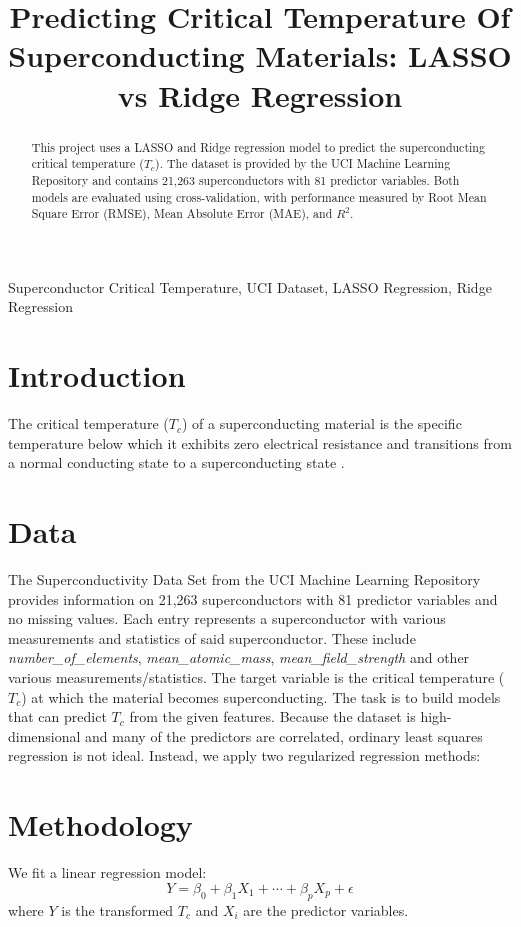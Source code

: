 \documentclass[conference]{IEEEtran}
\title{Predicting Critical Temperature Of Superconducting Materials: LASSO vs Ridge Regression}
\author{
  \IEEEauthorblockN{Miguel Ramirez}
  \IEEEauthorblockA{
    Department of Statistics and Data Science \\
    University of Central Florida \\
    Orlando, United States \\
    miramirez@knights.ucf.edu}
}
\begin{document}
\maketitle

\begin{abstract}
This project uses a LASSO and Ridge regression model to predict the superconducting critical temperature ($T_c$). 
The dataset is provided by the UCI Machine Learning Repository and contains 21,263 superconductors with 81 predictor variables. 
Both models are evaluated using cross-validation, with performance measured by Root Mean Square Error (RMSE), Mean Absolute Error (MAE), and $R^2$.
\end{abstract}
\begin{IEEEkeywords}
Superconductor Critical Temperature, UCI Dataset, LASSO Regression, Ridge Regression
\end{IEEEkeywords}

\section*{Introduction}

The critical temperature ($T_c$) of a superconducting material is the specific temperature below which it exhibits zero electrical resistance and transitions from a normal conducting state to a superconducting state \cite{sciencedirect_tc}.

\section{Data}
The Superconductivity Data Set from the UCI Machine Learning Repository provides information on 21,263 superconductors with 81 predictor variables and no missing values. 
Each entry represents a superconductor with various measurements and statistics of said superconductor. These include \emph{number\_of\_elements}, \emph{mean\_atomic\_mass}, \emph{mean\_field\_strength} and other various measurements/statistics. 
The target variable is the critical temperature ($T_c$) at which the material becomes superconducting. 
The task is to build models that can predict $T_c$ from the given features. 
Because the dataset is high-dimensional and many of the predictors are correlated, ordinary least squares regression is not ideal. Instead, we apply two regularized regression methods:

\section{Methodology}
We fit a linear regression model:
\begin{equation}
Y = \beta_0 + \beta_1X_1 + \cdots + \beta_pX_p + \epsilon
\end{equation}
where $Y$ is the transformed $T_c$ and $X_i$ are the predictor variables.
\end{document}

